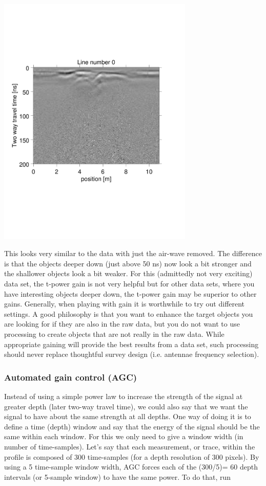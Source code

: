\documentclass[11pt]{article}
\begin{document}
\begin{center}
\includegraphics[width=0.7\textwidth, trim = 0.9cm 6cm 2cm
  6.5cm,clip]{figures/GPRlineHGt0}
\end{center}

This looks very similar to the data with just the air-wave
removed. The difference is that the objects deeper down (just above 50
ns) now look a bit stronger and the shallower objects look a bit
weaker. For this (admittedly not very exciting) data set, the t-power
gain is not very helpful but for other data sets, where you have
interesting objects deeper down, the t-power gain may be superior to
other gains. Generally, when playing with gain it is worthwhile to try
out different settings. A good philosophy is that you want to enhance
the target objects you are looking for if they are also in the raw
data, but you do not want to use processing to create objects that are
not really in the raw data. While appropriate gaining will provide the
best results from a data set, such processing should never replace
thoughtful survey design (i.e. antennae frequency selection). 

\subsubsection{Automated gain control (AGC)}

Instead of using a simple power law to increase the strength of the
signal at greater depth (later two-way travel time), we could also say
that we want the signal to have about the same strength at all
depths. One way of doing it is to define a time (depth) window and say
that the energy of the signal should be the same within each
window. For this we only need to give a window width (in number of
time-samples). Let's say that each measurement, or trace, within the profile is 
composed of 300 time-samples (for a depth resolution of 300 pixels).
By using a 5 time-sample window width, AGC forces each of the (300/5)= 60
depth intervals (or 5-sample window) to have the same power.
To do that, run
 
\end{document}
